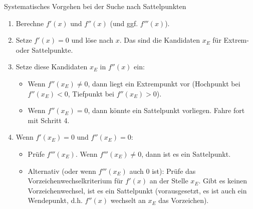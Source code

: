 \begin{tippumgebung}{Systematisches Vorgehen bei der Suche nach Sattelpunkten}
\begin{enumerate}
    \item Berechne $f'(x)$ und $f''(x)$ (und ggf. $f'''(x)$).
    \item Setze $f'(x)=0$ und löse nach $x$. Das sind die Kandidaten $x_E$ für Extrem- oder Sattelpunkte.
    \item Setze diese Kandidaten $x_E$ in $f''(x)$ ein:
        \begin{itemize}
            \item Wenn $f''(x_E) \neq 0$, dann liegt ein Extrempunkt vor (Hochpunkt bei $f''(x_E)<0$, Tiefpunkt bei $f''(x_E)>0$).
            \item Wenn $f''(x_E) = 0$, dann könnte ein Sattelpunkt vorliegen. Fahre fort mit Schritt 4.
        \end{itemize}
    \item Wenn $f'(x_E)=0$ und $f''(x_E)=0$:
        \begin{itemize}
            \item Prüfe $f'''(x_E)$. Wenn $f'''(x_E) \neq 0$, dann ist es ein Sattelpunkt.
            \item Alternativ (oder wenn $f'''(x_E)$ auch $0$ ist): Prüfe das Vorzeichenwechselkriterium für $f'(x)$ an der Stelle $x_E$. Gibt es keinen Vorzeichenwechsel, ist es ein Sattelpunkt (vorausgesetzt, es ist auch ein Wendepunkt, d.h. $f''(x)$ wechselt an $x_E$ das Vorzeichen).
        \end{itemize}
\end{enumerate}
\end{tippumgebung}

